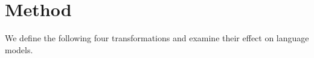 \documentclass[usenames,dvipsnames]{article} %
\begin{document}



  \section{Method}\label{sec:method}

  We define the following four transformations and examine their effect on language models.
\end{document}
